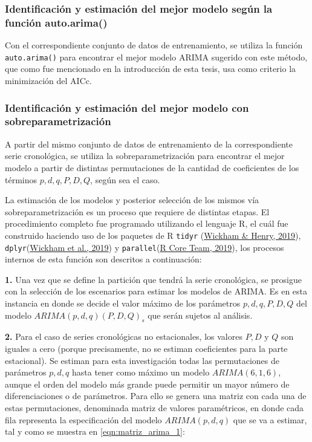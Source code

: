 \documentclass[
]{article}
\begin{document}
\subsubsection{Identificación y estimación del mejor modelo según la función auto.arima()}

Con el correspondiente conjunto de datos de entrenamiento, se utiliza la
función \texttt{auto.arima()} para encontrar el mejor modelo ARIMA
sugerido con este método, que como fue mencionado en la introducción de
esta tesis, usa como criterio la minimización del AICc.

\subsubsection{Identificación y estimación del mejor modelo con sobreparametrización}

A partir del mismo conjunto de datos de entrenamiento de la
correspondiente serie cronológica, se utiliza la sobreparametrización
para encontrar el mejor modelo a partir de distintas permutaciones de la
cantidad de coeficientes de los términos \(p,d,q, P,D,Q\), según sea el
caso.

La estimación de los modelos y posterior selección de los mismos vía
sobreparametrización es un proceso que requiere de distintas etapas. El
procedimiento completo fue programado utilizando el lenguaje R, el cuál
fue construido haciendo uso de los paquetes de R \texttt{tidyr}
(\protect\hyperlink{ref-tidyr}{Wickham \& Henry, 2019}),
\texttt{dplyr}(\protect\hyperlink{ref-dplyr}{Wickham et al., 2019}) y
\texttt{parallel}(\protect\hyperlink{ref-parallel}{R Core Team, 2019}),
los procesos internos de esta función son descritos a continuación:

\textbf{1.} Una vez que se define la partición que tendrá la serie
cronológica, se prosigue con la selección de los escenarios para estimar
los modelos de ARIMA. Es en esta instancia en donde se decide el valor
máximo de los parámetros \(p,d,q,P,D,Q\) del modelo
\(ARIMA(p,d,q)(P,D,Q)_s\) que serán sujetos al análisis.

\textbf{2.} Para el caso de series cronológicas no estacionales, los
valores \(P,D\) y \(Q\) son iguales a cero (porque precisamente, no se
estiman coeficientes para la parte estacional). Se estiman para esta
investigación todas las permutaciones de parámetros \(p,d,q\) hasta
tener como máximo un modelo \(ARIMA(6,1,6)\), aunque el orden del modelo
más grande puede permitir un mayor número de diferenciaciones o de
parámetros. Para ello se genera una matriz con cada una de estas
permutaciones, denominada matriz de valores paramétricos, en donde cada
fila representa la especificación del modelo \(ARIMA(p,d,q)\) que se va
a estimar, tal y como se muestra en \ref{eqn:matriz_arima_1}:
\end{document}
